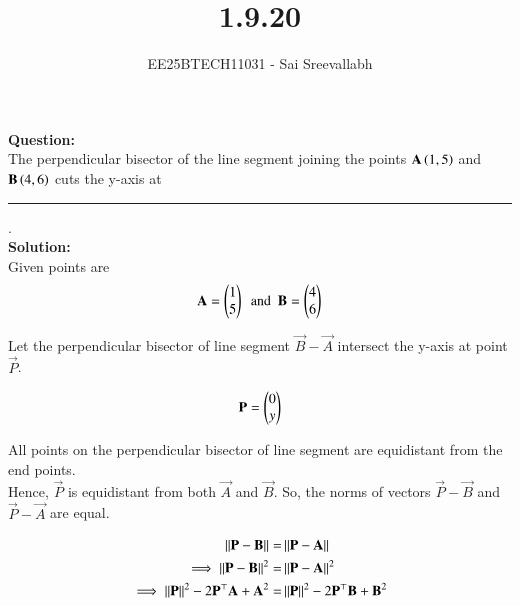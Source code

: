 \documentclass[journal]{IEEEtran}
\begin{document}

\vspace{3cm}

\title{1.9.20}
\author {EE25BTECH11031 - Sai Sreevallabh}
{\let\newpage\relax\maketitle}

\renewcommand{\thefigure}{\theenumi}
\renewcommand{\thetable}{\theenumi}
\setlength{\intextsep}{10pt} %


\renewcommand{\thetable}{\theenumi}

\textbf{Question: }\\

The perpendicular bisector of the line segment joining the points $\mathbf{A}\left(1,5\right)$ and $\mathbf{B}\left(4,6\right)$ cuts the y-axis at \rule{1.5cm}{0.4pt}.\\

\textbf{Solution: }\\

Given points are
\begin{align}
    \mathbf{A}= \begin{pmatrix}1\\5\end{pmatrix} \ \ \text{and}\ \ \mathbf{B} = \begin{pmatrix}4\\6\end{pmatrix}
\end{align}

Let the perpendicular bisector of line segment $\vec{B}-\vec{A}$ intersect the y-axis at point $\vec{P}$. 

\begin{align}
    \mathbf{P} = \begin{pmatrix}0\\y\end{pmatrix}
\end{align}

All points on the perpendicular bisector of line segment are equidistant from the end points. \\
Hence, $\vec{P}$ is equidistant from both $\vec{A}$ and $\vec{B}$. So, the norms of vectors $\vec{P}-\vec{B}$ and $\vec{P}-\vec{A}$ are equal. 

\begin{align}
    \left\lVert\mathbf{P}-\mathbf{B}\right\rVert =& \left\lVert\mathbf{P}-\mathbf{A}\right\rVert\\
    \implies  \left\lVert\mathbf{P}-\mathbf{B}\right\rVert^2 =& \left\lVert\mathbf{P}-\mathbf{A}\right\rVert^2\\
    \implies \left\lVert\mathbf{P}\right\rVert^2 - 2\mathbf{P}^\top\mathbf{A} + \mathbf{A}^2 =& \left\lVert\mathbf{P}\right\rVert^2 - 2\mathbf{P}^\top\mathbf{B} + \mathbf{B}^2
\end{align}
\end{document}

